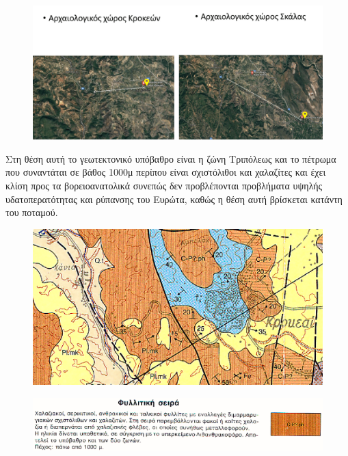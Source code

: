 \documentclass[12pt]{article}
\begin{document}
 	\begin{figure} [H]
 		\begin{center}
 			\includegraphics [scale = 0.40] {map55.png}
 		\end{center}
 	\end{figure}
 
 	Στη θέση αυτή το γεωτεκτονικό υπόβαθρο είναι η ζώνη Τριπόλεως και το πέτρωμα που συναντάται σε βάθος 1000μ περίπου είναι σχιστόλιθοι και χαλαζίτες και έχει κλίση προς τα βορειοανατολικά συνεπώς δεν προβλέπονται προβλήματα υψηλής υδατοπερατότητας και ρύπανσης του Ευρώτα, καθώς η θέση αυτή βρίσκεται κατάντη του ποταμού.
 	
 	\begin{figure} [H]
 		\begin{center}
 			\includegraphics [scale = 0.37] {map56.png}
 		\end{center}
 	\end{figure}
 
 	\begin{figure} [H]
 		\begin{center}
 			\includegraphics [scale = 0.34] {explain6.png}
 		\end{center}
 	\end{figure}
 
\end{document}

